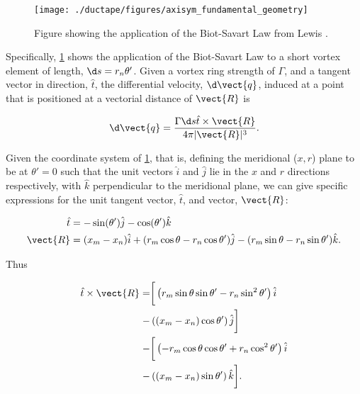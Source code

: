 \begin{figure}[h!]
	\centering
	\texttt{[image: ./ductape/figures/axisym\_fundamental\_geometry]}
	\caption{Figure showing the application of the Biot-Savart Law from Lewis \cite{Lewis_1991}.}
	\label{fig:axisym_fundamental_geometry}
\end{figure}

Specifically, \cref{fig:axisym_fundamental_geometry} shows the application of the Biot-Savart Law to a short vortex element of length, \(\d s= r_n\theta'\).
Given a vortex ring strength of \(\Gamma\), and a tangent vector in direction, \(\hat{t}\), the differential velocity, \(\d \vect{q}\), induced at a point that is positioned at a vectorial distance of \(\vect{R}\) is

\begin{equation}
\label{eqn:biotsavart}
	\d \vect{q} = \frac{\Gamma \d s \hat{t} \times \vect{R}}{4\pi|\vect{R}|^3}.
\end{equation}

Given the coordinate system of \cref{fig:axisym_fundamental_geometry}, that is, defining the meridional (\(x,r\)) plane to be at \(\theta'=0\) such that the unit vectors \(\hat{i}\) and \(\hat{j}\) lie in the \(x\) and \(r\) directions respectively, with \(\hat{k}\) perpendicular to the meridional plane, we can give specific expressions for the unit tangent vector, \(\hat{t}\), and vector, \(\vect{R}\):

\begin{align}
	\hat{t} &= -\sin(\theta')\hat{j} - \cos(\theta')\hat{k} \\
	\vect{R} &= (x_m - x_n)\hat{i} + (r_m \cos \theta - r_n \cos \theta')\hat{j} - (r_m \sin \theta - r_n \sin \theta')\hat{k}.
\end{align}

Thus

\begin{equation}
\begin{split}
	\hat{t} \times \vect{R} =& \bigg[ \left(r_m \sin \theta \sin \theta' - r_n \sin^2 \theta' \right) \hat{i} \\
 	-& \left((x_m-x_n) \cos \theta' \right) \hat{j} \bigg] \\
	-&\bigg[ \left(-r_m \cos \theta \cos \theta' + r_n \cos^2 \theta' \right) \hat{i} \\
 	-& \left((x_m-x_n) \sin \theta' \right) \hat{k} \bigg].
\end{split}
\end{equation}

